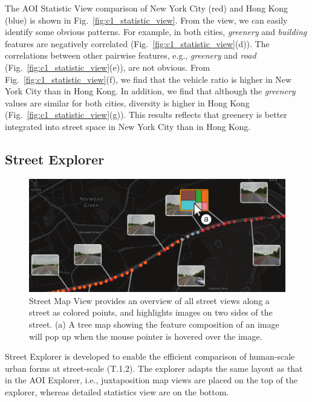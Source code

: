 The AOI Statistic View comparison of New York City (red) and Hong Kong (blue) is shown in Fig.~\ref{fig:c1_statistic_view}.
From the view, we can easily identify some obvious patterns.
For example, in both cities, \textit{greenery} and \textit{building} features are negatively correlated (Fig.~\ref{fig:c1_statistic_view}(d)).
The correlations between other pairwise features, e.g., \textit{greenery} and \textit{road} (Fig.~\ref{fig:c1_statistic_view}(e)), are not obvious.
From Fig.~\ref{fig:c1_statistic_view}(f), we find that the vehicle ratio is higher in New York City than in Hong Kong.
In addition, we find that although the \textit{greenery} values are similar for both cities, diversity is higher in Hong Kong (Fig.~\ref{fig:c1_statistic_view}(g)).
This results reflects that greenery is better integrated into street space in New York City than in Hong Kong.

\subsection{Street Explorer}
\label{ssec:c1_street_explorer}

\begin{figure}[t] 
	\centering
	\includegraphics[width=0.9\columnwidth]{figure/streetvizor/fig6_street_map_view/street_map_view}
	\vspace{-3mm}
	\caption{Street Map View provides an overview of all street views along a street as colored points, and highlights images on two sides of the street.
	(a) A tree map showing the feature composition of an image will pop up when the mouse pointer is hovered over the image.}
	\label{fig:c1_street_map}
	\vspace{-1mm}
\end{figure}


Street Explorer is developed to enable the efficient comparison of human-scale urban forms at street-scale (T.1.2). 
The explorer adapts the same layout as that in the AOI Explorer, i.e., juxtaposition map views are placed on the top of the explorer, whereas detailed statistics view are on the bottom. 


